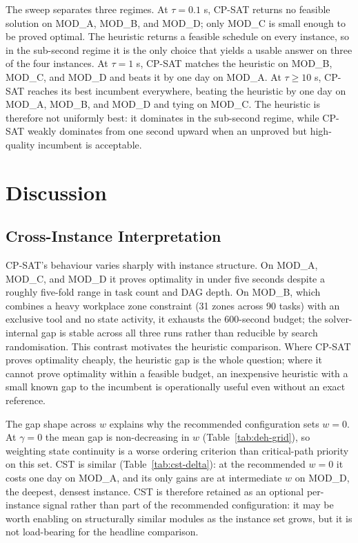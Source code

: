 \documentclass[conference]{IEEEtran}
\begin{document}
The sweep separates three regimes. At $\tau = 0.1$ s, CP-SAT returns
no feasible solution on MOD\_A, MOD\_B, and MOD\_D; only MOD\_C is
small enough to be proved optimal. The heuristic returns a feasible
schedule on every instance, so in the sub-second regime it is the
only choice that yields a usable answer on three of the four
instances. At $\tau = 1$ s, CP-SAT matches the heuristic on MOD\_B,
MOD\_C, and MOD\_D and beats it by one day on MOD\_A. At
$\tau \geq 10$ s, CP-SAT reaches its best incumbent everywhere,
beating the heuristic by one day on MOD\_A, MOD\_B, and MOD\_D and
tying on MOD\_C. The heuristic is therefore not uniformly best: it
dominates in the sub-second regime, while CP-SAT weakly dominates
from one second upward when an unproved but high-quality incumbent is
acceptable.

\section{Discussion}
\label{sec:discussion}

\subsection{Cross-Instance Interpretation}

CP-SAT's behaviour varies sharply with instance structure. On
MOD\_A, MOD\_C, and MOD\_D it proves optimality in under five seconds
despite a roughly five-fold range in task count and DAG depth. On
MOD\_B, which combines a heavy workplace zone constraint (31 zones across 90
tasks) with an exclusive tool and no state activity, it exhausts the
600-second budget; the solver-internal gap is stable across all three
runs rather than reducible by search randomisation. This contrast
motivates the heuristic comparison. Where CP-SAT proves optimality
cheaply, the heuristic gap is the whole question; where it cannot
prove optimality within a feasible budget, an inexpensive heuristic
with a small known gap to the incumbent is operationally useful even
without an exact reference.

The gap shape across $w$ explains why the recommended configuration
sets $w = 0$. At $\gamma = 0$ the mean gap is non-decreasing in $w$
(Table~\ref{tab:deh-grid}), so weighting state continuity is a worse
ordering criterion than critical-path priority on this set. CST is
similar (Table~\ref{tab:cst-delta}): at the recommended $w = 0$ it
costs one day on MOD\_A, and its only gains are at intermediate $w$ on
MOD\_D, the deepest, densest instance. CST is therefore retained as an
optional per-instance signal rather than part of the recommended
configuration: it may be worth enabling on structurally similar
modules as the instance set grows, but it is not load-bearing for the
headline comparison.
\end{document}
